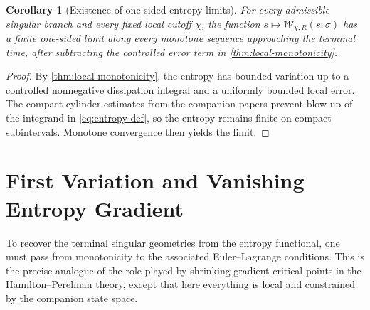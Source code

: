 \documentclass[11pt]{amsart}
\numberwithin{equation}{section}
\theoremstyle{plain}
\newtheorem{corollary}[theorem]{Corollary}
\theoremstyle{definition}
\theoremstyle{remark}
\newcommand{\Wloc}{\mathcal W}
\begin{document}
\begin{corollary}[Existence of one-sided entropy limits]
\label{cor:entropy-limit}
For every admissible singular branch and every fixed local cutoff \(\chi\), the
function \(s\mapsto \Wloc_{\chi,R}(s;\sigma)\) has a finite one-sided limit
along every monotone sequence approaching the terminal time, after subtracting
the controlled error term in \cref{thm:local-monotonicity}.
\end{corollary}

\begin{proof}
By \cref{thm:local-monotonicity}, the entropy has bounded variation up to a
controlled nonnegative dissipation integral and a uniformly bounded local error.
The compact-cylinder estimates from the companion papers prevent blow-up of the
integrand in \eqref{eq:entropy-def}, so the entropy remains finite on compact
subintervals.  Monotone convergence then yields the limit.
\end{proof}

\section{First Variation and Vanishing Entropy Gradient}
\label{sec:gradient}

To recover the terminal singular geometries from the entropy functional, one
must pass from monotonicity to the associated Euler--Lagrange conditions.  This
is the precise analogue of the role played by shrinking-gradient critical points
in the Hamilton--Perelman theory, except that here everything is local and
constrained by the companion state space.
\end{document}

